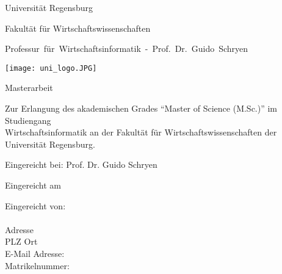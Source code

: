 %
%
%

\thispagestyle{empty}
\begin{titlepage}


\begin{adjustwidth}{-2cm}{}


\renewcommand{\thepage}{}

\begin{center}

\large{Universität Regensburg\\}

\large{Fakultät für Wirtschaftswissenschaften\\}

\large{\mbox{Professur für Wirtschaftsinformatik - Prof. Dr. Guido Schryen}}


\vspace*{5mm}

\Large{\textbf{\titelthema}}

\vspace*{5mm}
\texttt{[image: uni\_logo.JPG]}
\vspace*{4mm}

\Large{Masterarbeit}

\vspace*{5mm}


\end{center}
\begin{center}
Zur Erlangung des akademischen Grades "`Master of Science (M.Sc.)"' im Studiengang\\
Wirtschaftsinformatik an der Fakultät für Wirtschaftswissenschaften der\\
Universität Regensburg.\\





\vspace*{5mm}

\Large{Eingereicht bei: Prof. Dr. Guido Schryen\\}


\end{center}

\vfill

\begin{center}
\large{Eingereicht am \abgabedatum\\}
\end{center}
\vspace*{0.6cm}
\begin{flushleft}
Eingereicht von:\\
\vspace*{7pt}
\authorname\\
Adresse\\
PLZ Ort\\
E-Mail Adresse: \authormail\\
Matrikelnummer: \matrikelnr\\





\end{flushleft}
\end{adjustwidth}
\end{titlepage}
